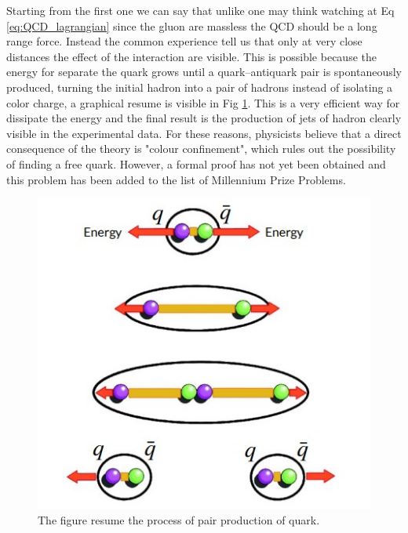 \documentclass[12pt,a4paper]{book}
\begin{document}
	Starting from the first one we can say that unlike one may think watching at Eq \ref{eq:QCD_lagrangian} since the gluon are massless the QCD should be a long range force. Instead the common experience tell us that only at very close distances the effect of the interaction are visible. This is possible because the energy for separate the quark grows until a quark–antiquark pair is spontaneously produced, turning the initial hadron into a pair of hadrons instead of isolating a color charge, a graphical resume is visible in Fig \ref{fig:quark_confinement}. This is a very efficient way for dissipate the energy and the final result is the production of jets of hadron clearly visible in the experimental data.  For these reasons, physicists believe that a direct consequence of the theory is "colour confinement", which rules out the possibility of finding a free quark. However, a formal proof has not yet been obtained and this problem has been added to the list of Millennium Prize Problems.
	\begin{figure}		
		\centering
		\includegraphics[width=0.7\linewidth]{pictures/quark_confinement.jpeg}
		\caption{The figure resume the process of pair production of quark. \cite{modern_physics}}
		\label{fig:quark_confinement} 
	\end{figure}
	
\end{document}
